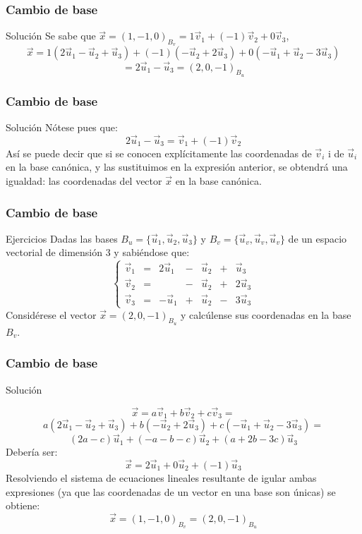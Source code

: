 \documentclass{beamer}
\begin{document}
\begin{frame}
  \frametitle{Cambio de base}
\begin{block}{Soluci\'on}
Se sabe que $\vec x = (1,-1,0)_{B_v} = 1\vec v_1 +(-1) \vec v_2 + 0 \vec v_3$,
\[\vec x = 1(2\vec u_1-\vec u_2 +\vec u_3) +(-1)(-\vec u_2+2\vec u_3) + 0(-\vec u_1+\vec u_2-3\vec u_3)\]
\[=2\vec u_1 -\vec u_3 = (2,0,-1)_{B_u}\]
\end{block}
\end{frame}


\begin{frame}
  \frametitle{Cambio de base}
\begin{block}{Soluci\'on}
N\'otese pues que:
\[2\vec u_1-\vec u_3 = \vec v_1+(-1)\vec v_2\]
As\'i se puede decir que si se conocen expl\'icitamente las coordenadas de $\vec v_i$ i de $\vec u_i$ en la base can\'onica, y las sustituimos en la expresi\'on anterior, se obtendr\'a una igualdad: las coordenadas del vector $\vec x$ en la base can\'onica. 
\end{block}
\end{frame}




 \begin{frame}
  \frametitle{Cambio de base}
\begin{block}{Ejercicios}
Dadas las bases $B_u=\{\vec u_1,\vec u_2,\vec u_3\}$ y $B_v=\{\vec u_v,\vec u_v,\vec u_v\}$ de un espacio vectorial de dimensi\'on 3 y sabi\'endose que: 
\[\left\{\begin{array}{ccccccc}\vec v_1 & = & 2\vec u_1 & - & \vec u_2 & + & \vec u_3 \\\vec v_2 & = &  & - & \vec u_2 & + & 2\vec u_3 \\\vec v_3 & = & -\vec u_1 & + & \vec u_2 & - & 3\vec u_3\end{array}\right.\]
Consid\'erese el vector $\vec x = (2,0,-1)_{B_u}$ y calc\'ulense sus coordenadas en la base $B_v$.


\end{block}
\end{frame}



\begin{frame}
  \frametitle{Cambio de base}
  \begin{block}{Soluci\'on}

\[\vec x = a\vec v_1 + b\vec v_2 +c\vec v_3 =\]
\[ a( 2\vec u_1  -  \vec u_2  +  \vec u_3) + b( -  \vec u_2  +  2\vec u_3)+c( -\vec u_1  +  \vec u_2  -  3\vec u_3) = \]
\[ (2a-c)\vec u_1 + (-a-b-c)\vec u_2 + (a+2b-3c)\vec u_3  \]
Deber\'ia ser:
\[\vec x = 2\vec u_1 + 0\vec u_2 + (-1)\vec u_3 \]
Resolviendo el sistema de ecuaciones lineales resultante de igular ambas expresiones (ya que las coordenadas de un vector en una base son \'unicas) se obtiene:
\[\vec x = (1,-1,0)_{B_v} = (2,0,-1)_{B_u}\]
\end{block}
\end{frame}
\end{document}
